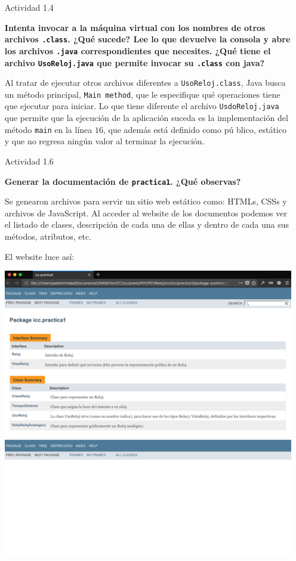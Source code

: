 \documentclass[11pt,letterpaper]{article}
\begin{document}
\begin{enumerate}
    \item [Actividad 1.4] {\bfseries Intenta invocar a la máquina virtual con los
    nombres de otros archivos \texttt{.class}. ¿Qué sucede? Lee lo que devuelve la consola
    y abre los archivos \texttt{.java} correspondientes que necesites. ¿Qué tiene el archivo
    \texttt{UsoReloj.java} que permite invocar su \texttt{.class} con java? \par}

        Al tratar de ejecutar otros archivos diferentes a \texttt{UsoReloj.class}, Java
        busca un método principal, \texttt{Main method}, que le especifique qué operaciones
        tiene que ejecutar para iniciar. Lo que tiene diferente el archivo
        \texttt{UsdoReloj.java} que permite que la ejecución de la aplicación suceda es la
        implementación del método \texttt{main} en la línea $16$, que además está definido
        como pú blico, estático y que no regresa ningún valor al terminar la ejecución.

    \vfill

    \item [Actividad 1.6] {\bfseries Generar la documentación de \texttt{practica1}. ¿Qué observas? \par}

        Se genearon archivos para servir un sitio web estático como: HTMLs, CSSs y archivos de
        JavaScript. Al acceder al website de los documentos podemos ver el listado de clases,
        descripción de cada una de ellas y dentro de cada una sus métodos, atributos, etc.

        El website luce así:

        \includegraphics[scale=.3]{assets/img/1-6.png}

\end{enumerate}
\end{document}
